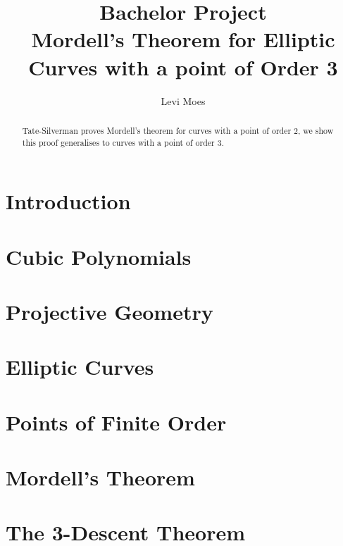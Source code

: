 \documentclass[11pt, oneside,a4paper]{article}
\title{Bachelor Project \\
  Mordell's Theorem for Elliptic Curves with a point of Order 3}
\author{Levi Moes}
\theoremstyle{definition}
\begin{document}
\maketitle

\begin{abstract}
  \noindent
  Tate-Silverman proves Mordell's theorem for curves with a point of order 2,
  we show this proof generalises to curves with a point of order 3.
\end{abstract}
\tableofcontents

\section{Introduction}
\label{sec:introduction}


\clearpage
\section{Cubic Polynomials}%
\label{sec:cubic_polynomials}


\clearpage
\section{Projective Geometry}%
\label{sec:projective_geometry}

\clearpage
\section{Elliptic Curves}%
\label{sec:elliptic_curves}


\clearpage
\section{Points of Finite Order}%
\label{sec:points_of_finite_order}


\clearpage
\section{Mordell's Theorem}%
\label{sec:mordell_s_theorem}


\clearpage
\section{The 3-Descent Theorem}%
\label{sec:the_3_descent_theorem}

\end{document}
